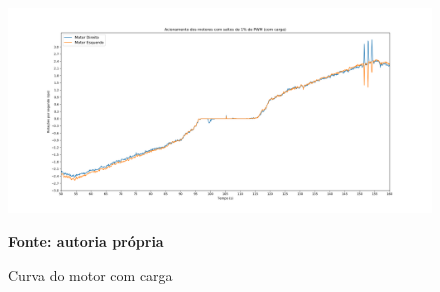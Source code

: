 \begin{figure}[!ht]
\centering
\caption{Curva do motor com carga}
\label{fig:acionamento2}
		\centering
		\includegraphics[trim={4.4cm 1cm 4.5cm 2cm},clip,
scale=0.38]{Figuras/Acionamento_Com_Carga_rps}
	
	\textbf{Fonte: autoria própria}
\end{figure}